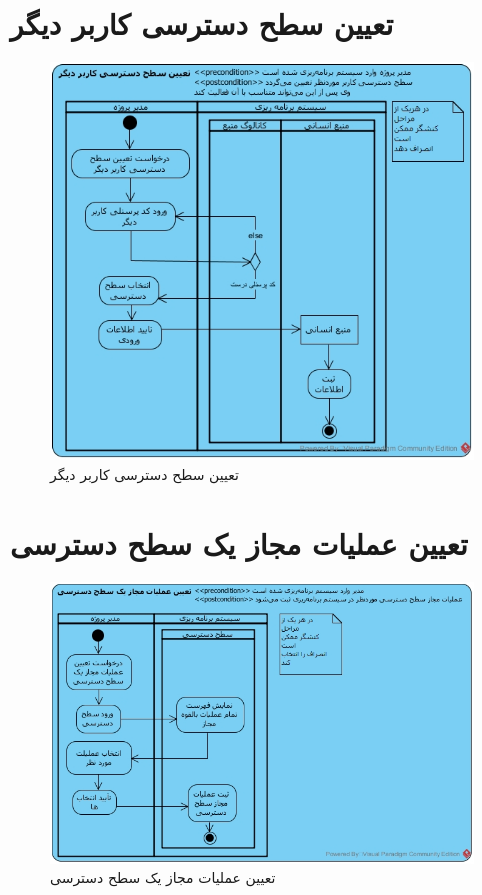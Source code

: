 \section{تعیین سطح دسترسی کاربر دیگر}
\begin{figure}[H]
	\centering
	\includegraphics[scale=0.8]{img/activity/SetUserAccessLevel}
	\caption{تعیین سطح دسترسی کاربر دیگر}
\end{figure}


\section{تعیین عملیات مجاز یک سطح دسترسی}
\begin{figure}[H]
	\centering
	\includegraphics[scale=0.7]{img/activity/SetPermissions}
	\caption{تعیین عملیات مجاز یک سطح دسترسی}
\end{figure}



